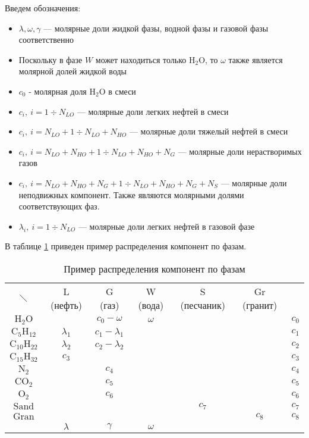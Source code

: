 \documentclass[12pt]{article}
\let\dividesymbol\div
\renewcommand{\div}{\operatorname{div}}
\begin{document}
Введем обозначения:
\begin{itemize}
\item $\lambda, \omega, \gamma$ --- молярные доли жидкой фазы, водной фазы и газовой фазы соответственно
\item Поскольку в фазе $W$ может находиться только $\mathrm{H_2O}$, то $\omega$ также является молярной долей жидкой воды
\item $c_0$ - молярная доля $\mathrm{H_2O}$ в смеси
\item $c_i, \: i = 1 \dividesymbol N_{LO}$ --- молярные доли легких нефтей в смеси
\item $c_i, \: i = N_{LO} + 1 \dividesymbol N_{LO} + N_{HO}$ --- молярные доли тяжелый нефтей в смеси
\item $c_i, \: i = N_{LO} + N_{HO} + 1 \dividesymbol N_{LO} + N_{HO} + N_G$ --- молярные доли нерастворимых газов
\item $c_i, \: i = N_{LO} + N_{HO} + N_G + 1 \dividesymbol N_{LO} + N_{HO} + N_G + N_S$ --- молярные доли неподвижных компонент. Также являются молярными долями соответствующих фаз. 
\item $\lambda_i, \: i = 1 \dividesymbol N_{LO}$ --- молярные доли легких нефтей в газовой фазе

\end{itemize}

В таблице \ref{t:compphases} приведен пример распределения компонент по фазам.

\begin{table}[ht!]
\centering
\begin{tabular}{c|c|c|c|c|c|c}
\multicolumn{1}{c}{$\diagdown$}&
\multicolumn{1}{c}{L (нефть)}&
\multicolumn{1}{c}{G (газ)}&
\multicolumn{1}{c}{W (вода)}&
\multicolumn{1}{c}{S (песчаник)}&
\multicolumn{1}{c}{Gr (гранит)}&
\multicolumn{1}{c}{}\\
\cline{2-6}
$\mathrm{H_2O}$& & $c_0 - \omega$ & $\omega$ & & & $c_0$\\
\cline{1-6}
$\mathrm{C_5H_{12}}$& $\lambda_1$ & $c_1 - \lambda_1$ & & & & $c_1$\\
\cline{2-6}
$\mathrm{C_{10}H_{22}}$& $\lambda_2$ & $c_2 - \lambda_2$ & & & & $c_2$\\
\cline{1-6}
$\mathrm{C_{15}H_{32}}$& $c_3$ & & & & & $c_3$\\
\cline{1-6}
$\mathrm{N_2}$& & $c_4$ & & & & $c_4$\\
\cline{2-6}
$\mathrm{CO_2}$& & $c_5$ & & & & $c_5$\\
\cline{2-6}
$\mathrm{O_2}$& & $c_6$ & & & & $c_6$\\
\cline{1-6}
$\mathrm{Sand}$& & & & $c_7$ & & $c_7$\\
\cline{2-6}
$\mathrm{Gran}$& & & & & $c_8$ & $c_8$\\
\cline{2-6}
\multicolumn{1}{c}{}&
\multicolumn{1}{c}{$\lambda$}&
\multicolumn{1}{c}{$\gamma$}&
\multicolumn{1}{c}{$\omega$}&
\multicolumn{1}{c}{}\\
\end{tabular}
\caption{Пример распределения компонент по фазам}
\label{t:compphases}
\end{table}
\end{document}
